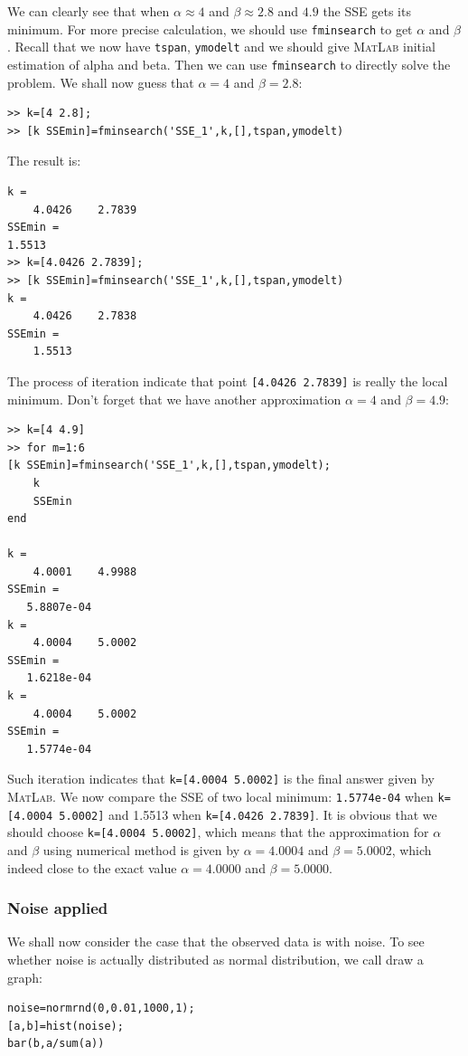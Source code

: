 \documentclass[a4paper]{article}
\begin{document}
We can clearly see that when $\alpha \approx 4$ and $\beta \approx 2.8$ and $4.9$ the SSE gets its minimum. For more precise calculation, we should use \verb$fminsearch$ to get $\alpha$ and $\beta$.
Recall that we now have \verb$tspan$, \verb$ymodelt$ and we should give \textsc{MatLab} initial estimation of alpha and beta. Then we can use \verb$fminsearch$ to directly solve the problem. We shall now guess that $\alpha=4$ and $\beta=2.8$:
\begin{verbatim}
>> k=[4 2.8];
>> [k SSEmin]=fminsearch('SSE_1',k,[],tspan,ymodelt)
\end{verbatim}
The result is:
\begin{verbatim}
k =
    4.0426    2.7839
SSEmin =
1.5513
>> k=[4.0426 2.7839];
>> [k SSEmin]=fminsearch('SSE_1',k,[],tspan,ymodelt)
k =
    4.0426    2.7838
SSEmin =
    1.5513
\end{verbatim}
The process of iteration indicate that point \verb$[4.0426 2.7839]$ is really the local minimum.
Don’t forget that we have another approximation $\alpha=4$ and $\beta=4.9$:
\begin{verbatim}
>> k=[4 4.9]
>> for m=1:6
[k SSEmin]=fminsearch('SSE_1',k,[],tspan,ymodelt);
	k
	SSEmin
end

k =
    4.0001    4.9988
SSEmin =
   5.8807e-04
k =
    4.0004    5.0002
SSEmin =
   1.6218e-04
k =
    4.0004    5.0002
SSEmin =
   1.5774e-04
\end{verbatim}
Such iteration indicates that \verb$k=[4.0004 5.0002]$ is the final answer given by \textsc{MatLab}. We now compare the SSE of two local minimum: \verb$1.5774e-04$ when \verb$k=[4.0004 5.0002]$ and 1.5513 when \verb$k=[4.0426 2.7839]$. It is obvious that we should choose \verb$k=[4.0004 5.0002]$, which means that the approximation for $\alpha$ and $\beta$ using numerical method is given by $\alpha=4.0004$ and $\beta=5.0002$, which indeed close to the exact value $\alpha=4.0000$ and $\beta=5.0000$.



\subsubsection{Noise applied}

We shall now consider the case that the observed data is with noise. To see whether noise is actually distributed as normal distribution, we call draw a graph:
\begin{verbatim}
noise=normrnd(0,0.01,1000,1);
[a,b]=hist(noise);
bar(b,a/sum(a))
\end{verbatim}
\end{document}

